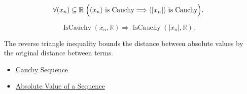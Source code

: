 \begin{remark*}
\[
\forall (x_n)\subseteq\mathbb{R}\;
\Bigl(
  (x_n)\text{ is Cauchy}
  \Longrightarrow
  (|x_n|)\text{ is Cauchy}
\Bigr).
\]
\end{remark*}

\begin{remark*}
\[
\operatorname{IsCauchy}(x_n,\mathbb{R})
\Longrightarrow
\operatorname{IsCauchy}(|x_n|,\mathbb{R}).
\]
\end{remark*}

\begin{remark*}[Interpretation]
The reverse triangle inequality bounds the distance between absolute values
by the original distance between terms.
\end{remark*}

\begin{dependencies}
\begin{itemize}
  \item \hyperref[def:cauchy-sequence]{Cauchy Sequence}
  \item \hyperref[def:absolute-value-sequence]{Absolute Value of a Sequence}
\end{itemize}
\end{dependencies}
